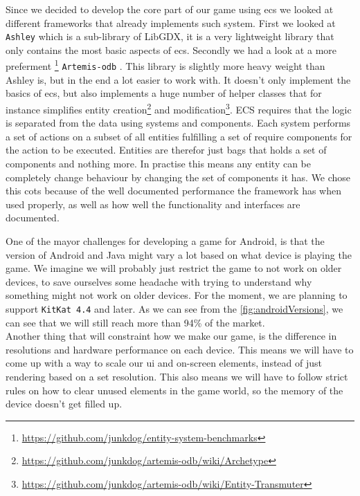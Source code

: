 Since we decided to develop the core part of our game using \gls{ecs} we looked at different frameworks that already implements such system. First we looked at \texttt{Ashley} \citep{ashley} which is a sub-library of LibGDX, it is a very lightweight library that only contains the most basic aspects of \gls{ecs}. Secondly we had a look at a more preferment \footnote{\url{https://github.com/junkdog/entity-system-benchmarks}} \texttt{Artemis-odb} \citep{artemis-odb}. This library is slightly more heavy weight than Ashley is, but in the end a lot easier to work with. It doesn't only implement the basics of ecs, but also implements a huge number of helper classes that for instance simplifies entity creation\footnote{\url{https://github.com/junkdog/artemis-odb/wiki/Archetype}} and modification\footnote{\url{https://github.com/junkdog/artemis-odb/wiki/Entity-Transmuter}}. ECS requires that the logic is separated from the data using systems and components. Each system performs a set of actions on a subset of all entities fulfilling a set of require components for the action to be executed. Entities are therefor just bags that holds a set of components and nothing more. In practise this means any entity can be completely change behaviour by changing the set of components it has.
We chose this \gls{cots} because of the well documented performance the framework has when used properly, as well as how well the functionality and interfaces are documented.

One of the mayor challenges for developing a game for Android, is that the version of Android and Java might vary a lot based on what device is playing the game. We imagine we will probably just restrict the game to not work on older devices, to save ourselves some headache with trying to understand why something might not work on older devices. For the moment, we are planning to support \texttt{KitKat 4.4} and later. As we can see from the \autoref{fig:androidVersions}, we can see that we will still reach more than 94\% of the market. \cite{android_2018} \\

Another thing that will constraint how we make our game, is the difference in resolutions and hardware performance on each device. This means we will have to come up with a way to scale our \gls{ui} and on-screen elements, instead of just rendering based on a set resolution. This also means we will have to follow strict rules on how to clear unused elements in the game world, so the memory of the device doesn't get filled up. \\

